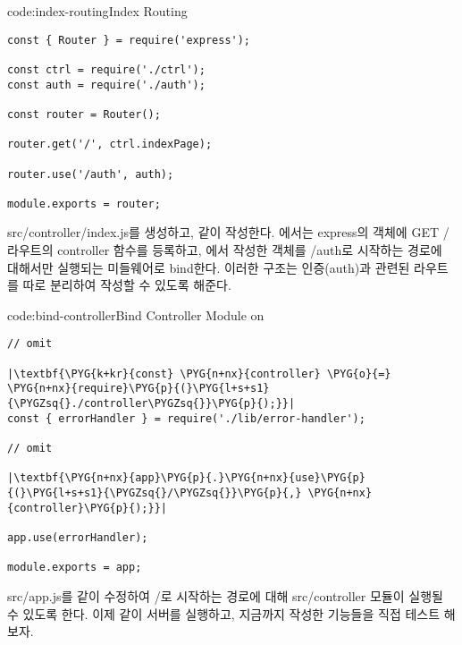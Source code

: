 \begin{code}{code:index-routing}{Index Routing}
\begin{verbatim}
const { Router } = require('express');

const ctrl = require('./ctrl');
const auth = require('./auth');

const router = Router();

router.get('/', ctrl.indexPage);

router.use('/auth', auth);

module.exports = router;
\end{verbatim}
\end{code}

src/controller/index.js를 생성하고, \과 같이 작성한다. 에서는 express의  객체에 GET / 라우트의 controller 함수를 등록하고, 에서 작성한  객체를 /auth로 시작하는 경로에 대해서만 실행되는 미들웨어로 bind한다. 이러한 구조는 인증(auth)과 관련된 라우트를 따로 분리하여 작성할 수 있도록 해준다.

\begin{code}{code:bind-controller}{Bind Controller Module on }
\begin{verbatim}
// omit

|\textbf{\PYG{k+kr}{const} \PYG{n+nx}{controller} \PYG{o}{=} \PYG{n+nx}{require}\PYG{p}{(}\PYG{l+s+s1}{\PYGZsq{}./controller\PYGZsq{}}\PYG{p}{);}}|
const { errorHandler } = require('./lib/error-handler');

// omit

|\textbf{\PYG{n+nx}{app}\PYG{p}{.}\PYG{n+nx}{use}\PYG{p}{(}\PYG{l+s+s1}{\PYGZsq{}/\PYGZsq{}}\PYG{p}{,} \PYG{n+nx}{controller}\PYG{p}{);}}|

app.use(errorHandler);

module.exports = app;
\end{verbatim}
\end{code}







src/app.js를 \와 같이 수정하여 /로 시작하는 경로에 대해 src/controller 모듈이 실행될 수 있도록 한다. 이제 \와 같이 서버를 실행하고, 지금까지 작성한 기능들을 직접 테스트 해보자.
\clearpage

